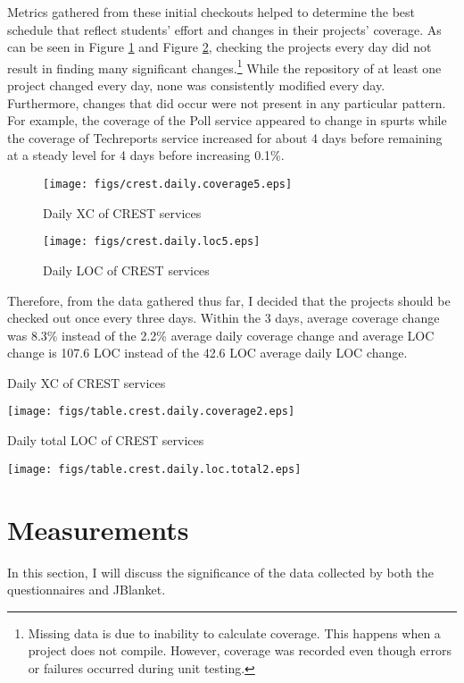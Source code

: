 Metrics gathered from these initial checkouts helped to determine the best
schedule that reflect students' effort and changes in their projects'
coverage.  As can be seen in Figure \ref{fig:crest.daily.coverage} and
Figure \ref{fig:crest.daily.loc}, checking the projects every day did not
result in finding many significant changes.\footnote{Missing data is due to
inability to calculate coverage.  This happens when a project does not
compile.  However, coverage was recorded even though errors or failures
occurred during unit testing.}  While the repository of at least one
project changed every day, none was consistently modified every day.
Furthermore, changes that did occur were not present in any particular
pattern.  For example, the coverage of the Poll service appeared to change
in spurts while the coverage of Techreports service increased for about 4
days before remaining at a steady level for 4 days before increasing 0.1\%.

\begin{figure}[htbp]
  \centering
  \texttt{[image: figs/crest.daily.coverage5.eps]}
  \caption{Daily XC of CREST services}
  \label{fig:crest.daily.coverage}
\end{figure}

\begin{figure}[htbp]
  \centering
  \texttt{[image: figs/crest.daily.loc5.eps]}
  \caption{Daily LOC of CREST services}
  \label{fig:crest.daily.loc}
\end{figure}

Therefore, from the data gathered thus far, I decided that the projects
should be checked out once every three days.  Within the 3 days, average
coverage change was 8.3\% instead of the 2.2\% average daily coverage
change and average LOC change is 107.6 LOC instead of the 42.6 LOC average
daily LOC change.

\begin{table}[htbp]
  \centering
  \caption{Daily XC of CREST services}
  \texttt{[image: figs/table.crest.daily.coverage2.eps]}
  \label{table:crest.daily.coverage}
\end{table}

\begin{table}[htbp]
  \centering
  \caption{Daily total LOC of CREST services}
  \texttt{[image: figs/table.crest.daily.loc.total2.eps]}
  \label{table:crest.daily.total}
\end{table}

\section{Measurements}
In this section, I will discuss the significance of the data collected by
both the questionnaires and JBlanket.

